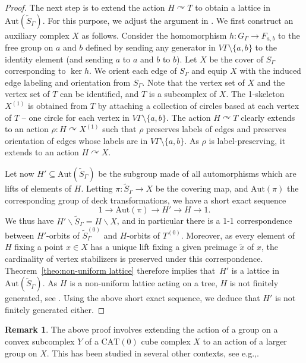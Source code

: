 \documentclass[11pt]{article}
\newcommand{\eg}{e.g.,\xspace}
\numberwithin{equation}{section}
\theoremstyle{plain}
\theoremstyle{definition}
\newtheorem{rk}[theo]{Remark}
\let\actson\curvearrowright
\newcommand{\Aut}{\mathrm{Aut}}
\begin{document}
\begin{proof}
The next step is to extend the action $H\actson T$ to obtain a lattice in $\Aut(\widetilde S_\Gamma)$. For this purpose, we adjust the argument in \cite[Th.\,9.5]{Hua2}. We first construct an auxiliary complex $X$ as follows. Consider the homomorphism $h:G_\Gamma\to F_{a,b}$ to the free group on $a$ and $b$ defined by sending any generator in $V\Gamma\setminus\{a,b\}$ to the identity element (and sending $a$ to $a$ and $b$ to $b$). Let $X$ be the cover of $S_\Gamma$ corresponding to $\ker h$. We orient each edge of $S_\Gamma$ and equip $X$ with the induced edge labeling and orientation from $S_\Gamma$. Note that the vertex set of $X$ and the vertex set of $T$ can be identified, and $T$ is a subcomplex of $X$. The 1-skeleton $X^{(1)}$ is obtained from $T$ by attaching a collection of circles based at each vertex of $T$ -- one circle for each vertex in $V\Gamma\setminus\{a,b\}$. The action $H\actson T$ clearly extends to an action $\rho:H\actson X^{(1)}$ such that $\rho$ preserves labels of edges and preserves orientation of edges whose labels are in $V\Gamma\setminus\{a,b\}$. As $\rho$ is label-preserving, it extends to an action $H\actson X$.

Let now $H'\subseteq \Aut(\widetilde{S}_\Gamma)$ be the subgroup made of all automorphisms which are lifts of elements of $H$. Letting $\pi:\widetilde{S}_\Gamma\to X$ be the covering map, and $\Aut(\pi)$ the corresponding group of deck transformations, we have a short exact sequence
\[
1\to\Aut(\pi)\to H'\to H\to 1.
\]
We thus have $H'\backslash\widetilde S_\Gamma=H\backslash X$, and in particular there is a 1-1 correspondence between $H'$-orbits of $\widetilde S^{(0)}_\Gamma$ and $H$-orbits of $T^{(0)}$. Moreover, as every element of $H$ fixing a point $x\in X$ has a unique lift fixing a given preimage $\widetilde{x}$ of $x$, the cardinality of vertex stabilizers is preserved under this correspondence. Theorem~\ref{theo:non-uniform lattice} therefore implies that~$H'$ is a lattice in $\Aut(\widetilde S_\Gamma)$. As $H$ is a non-uniform lattice acting on a tree, $H$ is not finitely generated, see \cite[Cor.\,5.16]{bass2001tree}. Using the above short exact sequence, we deduce that $H'$ is not finitely generated either.
\end{proof}

\begin{rk}
The above proof involves extending the action of a group on a convex subcomplex $Y$ of a $\mathrm{CAT}(0)$ cube complex $X$ to an action of a larger group on $X$. This has been studied in several other contexts, see \eg \cite{haglund2008finite,haglund2008special}.
\end{rk}
\end{document}
